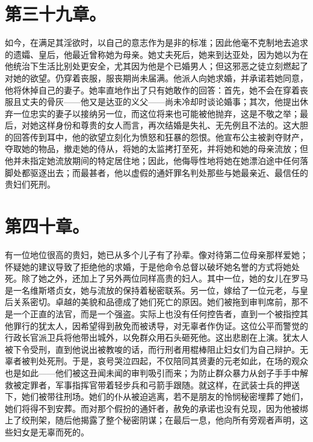 
\section{第三十九章。}

如今，在满足其淫欲时，以自己的意志作为是非的标准；因此他毫不克制地去追求的遗孀、皇后，他最近曾称她为母亲。她丈夫死后，她来到达亚处，因为她以为在他统治下生活比别处更安全，尤其因为他是个已婚男人；但这邪恶之徒立刻燃起了对她的欲望。仍穿着丧服，服丧期尚未届满。他派人向她求婚，并承诺若她同意，他将休掉自己的妻子。她率直地作出了只有她敢作的回答：首先，她不会在穿着丧服且丈夫的骨灰——他又是达亚的义父——尚未冷却时谈论婚事；其次，他提出休弃一位忠实的妻子以接纳另一位，而这位将来也可能被他抛弃，这是不敬之举；最后，对她这样身份和尊贵的女人而言，再次结婚是失礼、无先例且不法的。这大胆的回答传到耳中，他的欲望立刻化为愤怒和狂暴的怨恨。他宣布公主被剥夺财产，夺取她的物品，撤走她的侍从，将她的太监拷打至死，并将她和她的母亲流放；但他并未指定她流放期间的特定居住地；因此，他侮辱性地将她在她漂泊途中任何落脚处都驱逐出去；而最甚者，他以虚假的通奸罪名判处那些与她最亲近、最信任的贵妇们死刑。\par


\section{第四十章。}

有一位地位很高的贵妇，她已从多个儿子有了孙辈。像对待第二位母亲那样爱她；怀疑她的建议导致了拒绝他的求婚，于是他命令总督以破坏她名誉的方式将她处死。除了她之外，还加上了另外两位同样高贵的妇人。其中一位，她的女儿在罗马是一名维斯塔贞女，她与流放的保持着秘密联系。另一位，嫁给了一位元老，与皇后关系密切。卓越的美貌和品德成了她们死亡的原因。她们被拖到审判席前，那不是一个正直的法官，而是一个强盗。实际上也没有任何控告者，直到一个被指控其他罪行的犹太人，因希望得到赦免而被诱导，对无辜者作伪证。这位公平而警觉的行政长官派卫兵将他带出城外，以免群众用石头砸死他。这出悲剧在上演。犹太人被下令受刑，直到他说出被教唆的话，而行刑者用棍棒阻止妇女们为自己辩护。无辜者被判处死刑。于是，哀号哭泣四起，不仅陪同其贤妻的元老如此，在场的观众也是如此——他们被这丑闻未闻的审判吸引而来；为防止群众暴力从刽子手手中解救被定罪者，军事指挥官带着轻步兵和弓箭手跟随。就这样，在武装士兵的押送下，她们被带往刑场。她们的仆从被迫逃离，若不是朋友的怜悯秘密埋葬了她们，她们将得不到安葬。而对那个假扮的通奸者，赦免的承诺也没有兑现，因为他被绑上了绞刑架，随后他揭露了整个秘密阴谋；在最后一息，他向所有旁观者声明，这些妇女是无辜而死的。\par

